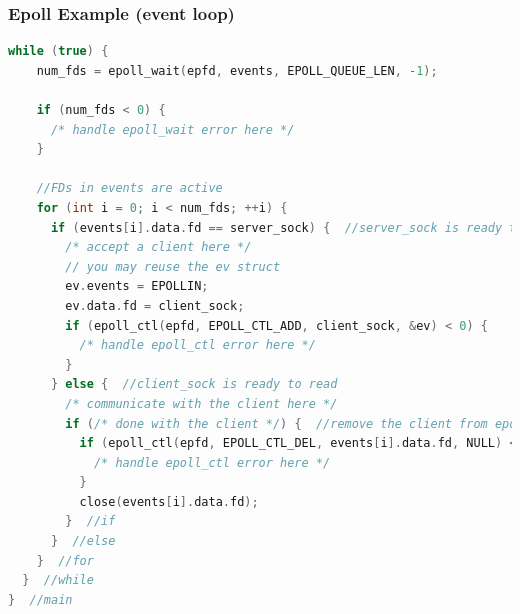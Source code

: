 \documentclass[aspectratio=43]{beamer}
\begin{document}
\begin{frame}[fragile]
  \frametitle{Epoll Example (event loop)}
\begin{lstlisting}[language=C++,basicstyle=\ttfamily\tiny,commentstyle=\color{commgreen},keywordstyle=\color{blue},breaklines=true]
  while (true) {  
    num_fds = epoll_wait(epfd, events, EPOLL_QUEUE_LEN, -1);

    if (num_fds < 0) {
      /* handle epoll_wait error here */
    }
    
    //FDs in events are active
    for (int i = 0; i < num_fds; ++i) {
      if (events[i].data.fd == server_sock) {  //server_sock is ready to accept
        /* accept a client here */
        // you may reuse the ev struct
        ev.events = EPOLLIN;
        ev.data.fd = client_sock;
        if (epoll_ctl(epfd, EPOLL_CTL_ADD, client_sock, &ev) < 0) {
          /* handle epoll_ctl error here */
        } 
      } else {  //client_sock is ready to read
        /* communicate with the client here */
        if (/* done with the client */) {  //remove the client from epoll queue               
          if (epoll_ctl(epfd, EPOLL_CTL_DEL, events[i].data.fd, NULL) < 0) {
            /* handle epoll_ctl error here */
          }
          close(events[i].data.fd);
        }  //if
      }  //else
    }  //for
  }  //while
}  //main
   \end{lstlisting}
\end{frame}
\end{document}
